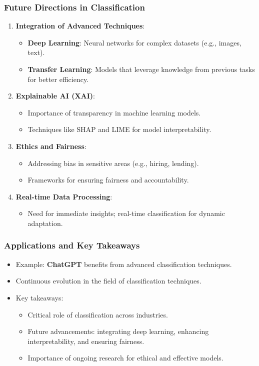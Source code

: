\documentclass[aspectratio=169]{beamer}
\begin{document}
\begin{frame}[fragile]
    \frametitle{Future Directions in Classification}
    \begin{enumerate}
        \item \textbf{Integration of Advanced Techniques}:
            \begin{itemize}
                \item \textbf{Deep Learning}: Neural networks for complex datasets (e.g., images, text).
                \item \textbf{Transfer Learning}: Models that leverage knowledge from previous tasks for better efficiency.
            \end{itemize}
        \item \textbf{Explainable AI (XAI)}:
            \begin{itemize}
                \item Importance of transparency in machine learning models.
                \item Techniques like SHAP and LIME for model interpretability.
            \end{itemize}
        \item \textbf{Ethics and Fairness}:
            \begin{itemize}
                \item Addressing bias in sensitive areas (e.g., hiring, lending).
                \item Frameworks for ensuring fairness and accountability.
            \end{itemize}
        \item \textbf{Real-time Data Processing}:
            \begin{itemize}
                \item Need for immediate insights; real-time classification for dynamic adaptation.
            \end{itemize}
    \end{enumerate}
\end{frame}

\begin{frame}[fragile]
    \frametitle{Applications and Key Takeaways}
    \begin{itemize}
        \item Example: \textbf{ChatGPT} benefits from advanced classification techniques.
        \item Continuous evolution in the field of classification techniques.
        \item Key takeaways:
            \begin{itemize}
                \item Critical role of classification across industries.
                \item Future advancements: integrating deep learning, enhancing interpretability, and ensuring fairness.
                \item Importance of ongoing research for ethical and effective models.
            \end{itemize}
    \end{itemize}
\end{frame}
\end{document}
